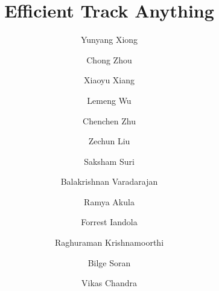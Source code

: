 \documentclass[]{fairmeta}
\title{Efficient Track Anything}
\author[1,\dagger]{Yunyang Xiong}
\author[1,2]{Chong Zhou}
\author[1]{Xiaoyu Xiang}
\author[1]{Lemeng Wu}
\author[1]{Chenchen Zhu}
\author[1]{Zechun Liu}
\author[1]{Saksham Suri}
\author[1]{Balakrishnan Varadarajan}
\author[1]{Ramya Akula}
\author[1]{Forrest Iandola}
\author[1,\dagger]{Raghuraman Krishnamoorthi}
\author[1,\dagger]{Bilge Soran}
\author[1,\dagger]{Vikas Chandra}
\affiliation[1]{Meta AI}
\affiliation[2]{Nanyang Technological University}
\begin{document}
\maketitle











\clearpage
\newpage
\beginappendix


\end{document}
